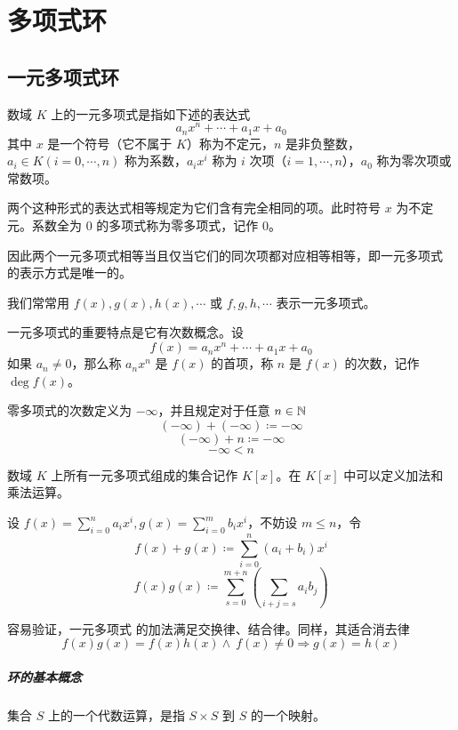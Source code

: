 \chapter{多项式环}

\section{一元多项式环}

\begin{definition}
    数域 $K$ 上的一元多项式是指如下述的表达式
    \[a_nx^n+\cdots + a_1x + a_0\]
    其中 $x$ 是一个符号（它不属于 $K$）称为不定元，$n$ 是非负整数，$a_i\in K(i=0,\cdots,n)$ 称为系数，$a_ix^i$ 称为 $i$ 次项（$i=1,\cdots,n$），$a_0$ 称为零次项或常数项。
\end{definition}

两个这种形式的表达式相等规定为它们含有完全相同的项。此时符号 $x$ 为不定元。系数全为 $0$ 的多项式称为零多项式，记作 $0$。

因此两个一元多项式相等当且仅当它们的同次项都对应相等相等，即一元多项式 的表示方式是唯一的。

我们常常用 $f(x),g(x),h(x),\cdots$ 或 $f,g,h,\cdots$ 表示一元多项式。

一元多项式的重要特点是它有次数概念。设
\[f(x) = a_nx^n+\cdots + a_1x + a_0\]
如果 $a_n\ne 0$，那么称 $a_nx^n$ 是 $f(x)$ 的首项，称 $n$ 是 $f(x)$ 的次数，记作 $\deg f(x)$。

零多项式的次数定义为 $-\infty$，并且规定对于任意 $n\in \mathbb{N}$
\[(-\infty)+(-\infty)\coloneqq -\infty\]
\[(-\infty) +n \coloneqq  -\infty\]
\[-\infty < n\]

数域 $K$ 上所有一元多项式组成的集合记作 $K[x]$。在 $K[x]$ 中可以定义加法和乘法运算。

设 $f(x) = \displaystyle\sum_{i=0}^na_ix^i,g(x) = \sum_{i=0}^mb_ix^i$，不妨设 $m \leqslant n$，令
\[f(x) + g(x) \coloneqq  \sum_{i=0}^n(a_i+b_i)x^i\]
\[f(x)g(x) \coloneqq  \sum_{s=0}^{m+n}\left(\sum_{i+j=s}a_ib_j\right)\]

容易验证，一元多项式 的加法满足交换律、结合律。同样，其适合消去律
\[f(x)g(x) = f(x)h(x) \land \ f(x)\ne 0 \Rightarrow g(x) = h(x)\]

\paragraph{环的基本概念}

集合 $S$ 上的一个代数运算，是指 $S\times S$ 到 $S$ 的一个映射。

